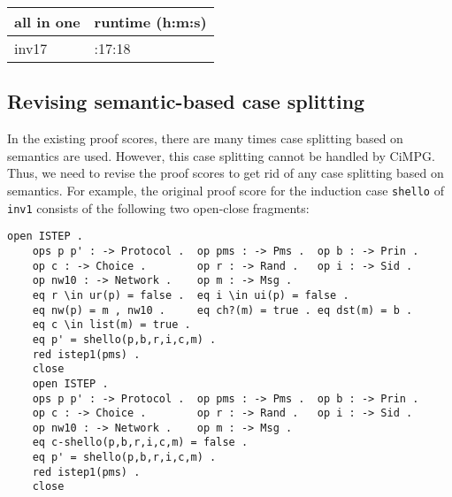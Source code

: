 \documentclass[a4paper,fleqn]{cas-dc}
\begin{document}
\begin{table}[]
\begin{tabularx}{0.48\textwidth} { 
  | >{\centering\arraybackslash}X 
  | >{\centering\arraybackslash}X|
 }
 \hline
 all in one & runtime (h:m:s) \\
 \hline
 inv17 & 52:17:18 \\
 \hline
\end{tabularx}
\end{table}


\subsection{Revising semantic-based case splitting}
In the existing proof scores, there are many times case splitting based on semantics are used. However, this case splitting cannot be handled by CiMPG. Thus, we need to revise the proof scores to get rid of any case splitting based on semantics. For example, the original proof score for the induction case  \verb!shello!  of \verb!inv1! consists of the following two open-close fragments:

\begin{small}
\begin{verbatim}
open ISTEP .
	ops p p' : -> Protocol .  op pms : -> Pms .  op b : -> Prin .
	op c : -> Choice .        op r : -> Rand .   op i : -> Sid . 
	op nw10 : -> Network .    op m : -> Msg .           
	eq r \in ur(p) = false .  eq i \in ui(p) = false .
	eq nw(p) = m , nw10 .     eq ch?(m) = true . eq dst(m) = b .
	eq c \in list(m) = true . 
	eq p' = shello(p,b,r,i,c,m) .
	red istep1(pms) .
	close
	open ISTEP .
	ops p p' : -> Protocol .  op pms : -> Pms .  op b : -> Prin .
	op c : -> Choice .        op r : -> Rand .   op i : -> Sid . 
	op nw10 : -> Network .    op m : -> Msg .           
	eq c-shello(p,b,r,i,c,m) = false . 
	eq p' = shello(p,b,r,i,c,m) .
	red istep1(pms) .
	close
\end{verbatim}
\end{small}
\end{document}
